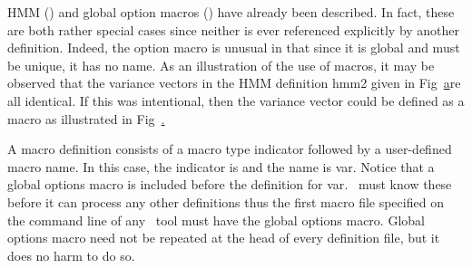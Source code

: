 
HMM () and global option macros
 ()
have already been described.  In fact, these are both rather
special cases since neither is ever referenced explicitly by
another definition.  Indeed, the option macro is unusual in that
since it is global and must be unique, it has no name.
As an illustration of the use of macros, it may be observed
that the variance vectors in the HMM definition \textsf{hmm2} given
in Fig~\href{f:hmm2def} are all identical.  If this was
intentional, then the variance vector could be defined as a macro
as illustrated in Fig~\href{f:mac5def}.  

A macro definition consists of a macro type indicator
followed by a user-defined macro name.  In this case, the indicator is 
and the name is \textsf{var}. Notice that a global options macro is included
before the definition for \textsf{var}. \HTK\ must know these before it can
process any other definitions thus the first macro file specified on the
command line of any \HTK\ tool must have the global options macro.  Global
options macro need not be repeated at the head of every definition file, but it
does no harm to do so.

